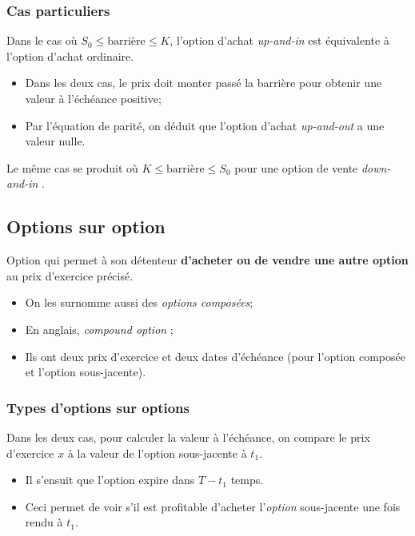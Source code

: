 \documentclass[10pt, french]{article}
\begin{document}
\begin{multicols*}{2}
\subsubsection*{Cas particuliers}

Dans le cas où $S_{0} \leq \text{barrière} \leq K$, l'option d'achat \og \textit{up-and-in} \fg{} est équivalente à l'option d'achat ordinaire. 
\begin{itemize}[leftmargin = *]
	\item	Dans les deux cas, le prix doit monter passé la barrière pour obtenir une valeur à l'échéance positive;
	\item	Par l'équation de parité, on déduit que l'option d'achat \og \textit{up-and-out} \fg{} a une valeur nulle.
\end{itemize}

Le même cas se produit où $K \leq \text{barrière} \leq S_{0}$ pour une option de vente \og \textit{down-and-in} \fg{}.


\columnbreak
\subsection{Options sur option}
\begin{definitionNOHFILL}
Option qui permet à son détenteur \textbf{d'acheter ou de vendre une autre option} au prix d'exercice précisé.

\tcbline

\begin{itemize}[leftmargin = *]
	\item	On les surnomme aussi des \textit{options composées};
	\item	En anglais, \og \textit{compound option} \fg{};
	\item	Ils ont deux prix d'exercice et deux dates d'échéance (pour l'option composée et l'option sous-jacente).
\end{itemize}
\end{definitionNOHFILL}

\subsubsection*{Types d'options sur options}
Dans les deux cas, pour calculer la valeur à l'échéance, on compare le prix d'exercice $x$ à la valeur de l'option sous-jacente à $t_{1}$.
\begin{itemize}
	\item	Il s'ensuit que l'option expire dans $T - t_{1}$ temps.
	\item	Ceci permet de voir s'il est profitable d'acheter l'\textit{option} sous-jacente une fois rendu à $t_{1}$.
\end{itemize}


\end{multicols*}
\end{document}
